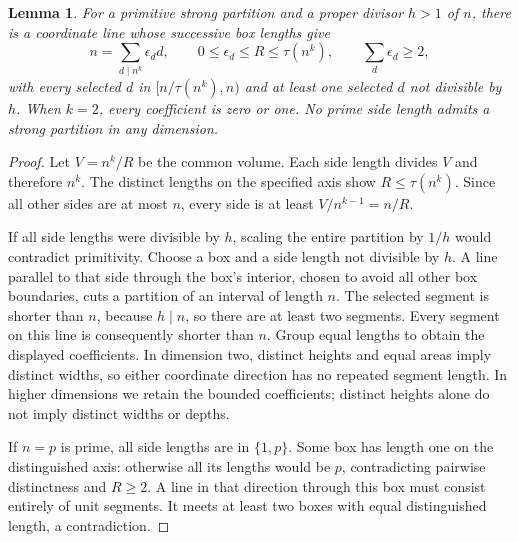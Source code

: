 \documentclass[11pt,a4paper]{article}
\newtheorem{lemma}[theorem]{Lemma}
\begin{document}
\begin{lemma}\label{trace}
For a primitive strong partition and a proper divisor $h>1$ of $n$,
there is a coordinate line whose successive box lengths give
\[
 n=\sum_{d\mid n^k}\epsilon_d d,\qquad
 0\le\epsilon_d\le R\le\tau(n^k),\qquad
 \sum_d\epsilon_d\ge2,
\]
with every selected $d$ in $[n/\tau(n^k),n)$ and at least one selected
$d$ not divisible by $h$. When $k=2$, every coefficient is zero or one.
No prime side length admits a strong partition in any dimension.
\end{lemma}
\begin{proof}
Let $V=n^k/R$ be the common volume. Each side length divides $V$ and
therefore $n^k$. The distinct lengths on the specified axis show
$R\le\tau(n^k)$. Since all other sides are at most $n$, every side is
at least $V/n^{k-1}=n/R$.

If all side lengths were divisible by $h$, scaling the entire partition
by $1/h$ would contradict primitivity. Choose a box and a side length
not divisible by $h$. A line parallel to that side through the box's
interior, chosen to avoid all other box boundaries, cuts a partition of
an interval of length $n$. The selected segment is shorter than $n$,
because $h\mid n$, so there are at least two segments. Every segment
on this line is consequently shorter than $n$. Group equal lengths to
obtain the displayed coefficients. In dimension two, distinct heights
and equal areas imply distinct widths, so either coordinate direction
has no repeated segment length. In higher dimensions we retain the
bounded coefficients; distinct heights alone do not imply distinct
widths or depths.

If $n=p$ is prime, all side lengths are in $\{1,p\}$. Some box has
length one on the distinguished axis: otherwise all its lengths would
be $p$, contradicting pairwise distinctness and $R\ge2$. A line in
that direction through this box must consist entirely of unit segments.
It meets at least two boxes with equal distinguished length, a
contradiction.
\end{proof}
\end{document}
